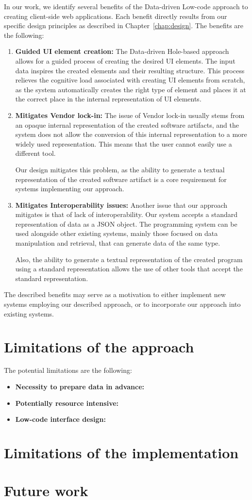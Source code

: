 In our work, we identify several benefits of the Data-driven Low-code approach to creating client-side web applications.
Each benefit directly results from our specific design principles as described in Chapter~\ref{chap:design}.
The benefits are the following:
\begin{enumerate}
	\item \textbf{Guided UI element creation:} The Data-driven Hole-based approach allows for a guided process of creating the desired UI elements.
	      The input data inspires the created elements and their resulting structure.
	      This process relieves the cognitive load associated with creating UI elements from scratch, as the system automatically creates the right type
	      of element and places it at the correct place in the internal representation of UI elements.
	\item \textbf{Mitigates Vendor lock-in:} The issue of Vendor lock-in usually stems from an opaque internal representation of the created software artifacts,
	      and the system does not allow the conversion of this internal representation to a more widely used representation.
	      This means that the user cannot easily use a different tool.

	      Our design mitigates this problem, as the ability to generate a textual representation of the created software artifact is a core requirement
	      for systems implementing our approach.
	\item \textbf{Mitigates Interoperability issues:} Another issue that our approach mitigates is that of lack of interoperability.
	      Our system accepts a standard representation of data as a JSON object.
	      The programming system can be used alongside other existing systems, mainly those focused on data manipulation and retrieval,
	      that can generate data of the same type.

	      Also, the ability to generate a textual representation of the created program using a standard representation allows the use of other tools that accept the standard representation.
\end{enumerate}

The described benefits may serve as a motivation to either implement new systems employing our described approach,
or to incorporate our approach into existing systems.

\section{Limitations of the approach}

The potential limitations are the following:
\begin{itemize}
	\item \textbf{Necessity to prepare data in advance:}
	\item \textbf{Potentially resource intensive:}
	\item \textbf{Low-code interface design:}
\end{itemize}

\section{Limitations of the implementation}

\section{Future work}

